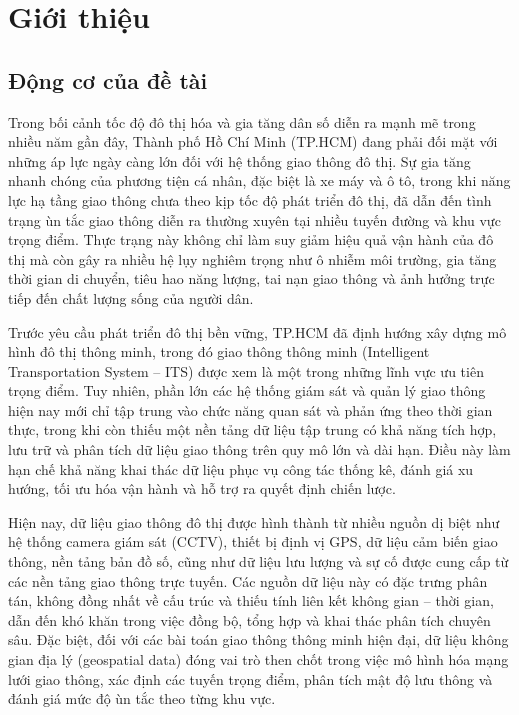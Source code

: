 \section{Giới thiệu}
\subsection{Động cơ của đề tài}

Trong bối cảnh tốc độ đô thị hóa và gia tăng dân số diễn ra mạnh mẽ trong nhiều năm gần đây, Thành phố Hồ Chí Minh (TP.HCM) đang phải đối mặt với những áp lực ngày càng lớn đối với hệ thống giao thông đô thị. Sự gia tăng nhanh chóng của phương tiện cá nhân, đặc biệt là xe máy và ô tô, trong khi năng lực hạ tầng giao thông chưa theo kịp tốc độ phát triển đô thị, đã dẫn đến tình trạng ùn tắc giao thông diễn ra thường xuyên tại nhiều tuyến đường và khu vực trọng điểm. Thực trạng này không chỉ làm suy giảm hiệu quả vận hành của đô thị mà còn gây ra nhiều hệ lụy nghiêm trọng như ô nhiễm môi trường, gia tăng thời gian di chuyển, tiêu hao năng lượng, tai nạn giao thông và ảnh hưởng trực tiếp đến chất lượng sống của người dân.

Trước yêu cầu phát triển đô thị bền vững, TP.HCM đã định hướng xây dựng mô hình đô thị thông minh, trong đó giao thông thông minh (Intelligent Transportation System – ITS) được xem là một trong những lĩnh vực ưu tiên trọng điểm. Tuy nhiên, phần lớn các hệ thống giám sát và quản lý giao thông hiện nay mới chỉ tập trung vào chức năng quan sát và phản ứng theo thời gian thực, trong khi còn thiếu một nền tảng dữ liệu tập trung có khả năng tích hợp, lưu trữ và phân tích dữ liệu giao thông trên quy mô lớn và dài hạn. Điều này làm hạn chế khả năng khai thác dữ liệu phục vụ công tác thống kê, đánh giá xu hướng, tối ưu hóa vận hành và hỗ trợ ra quyết định chiến lược.

Hiện nay, dữ liệu giao thông đô thị được hình thành từ nhiều nguồn dị biệt như hệ thống camera giám sát (CCTV), thiết bị định vị GPS, dữ liệu cảm biến giao thông, nền tảng bản đồ số, cũng như dữ liệu lưu lượng và sự cố được cung cấp từ các nền tảng giao thông trực tuyến. Các nguồn dữ liệu này có đặc trưng phân tán, không đồng nhất về cấu trúc và thiếu tính liên kết không gian – thời gian, dẫn đến khó khăn trong việc đồng bộ, tổng hợp và khai thác phân tích chuyên sâu. Đặc biệt, đối với các bài toán giao thông thông minh hiện đại, dữ liệu không gian địa lý (geospatial data) đóng vai trò then chốt trong việc mô hình hóa mạng lưới giao thông, xác định các tuyến trọng điểm, phân tích mật độ lưu thông và đánh giá mức độ ùn tắc theo từng khu vực.

